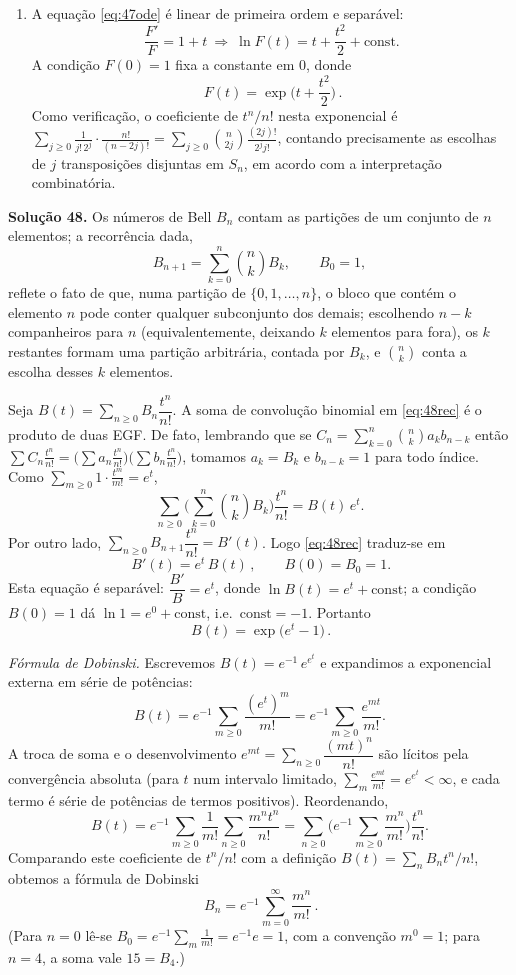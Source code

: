 \begin{enumerate}[label=(\alph*)]
\item A equação \eqref{eq:47ode} é linear de primeira ordem e separável:
\[
\frac{F'}{F}=1+t\ \Longrightarrow\ \ln F(t)=t+\frac{t^2}{2}+\text{const}.
\]
A condição $F(0)=1$ fixa a constante em $0$, donde
\[
\boxed{\,F(t)=\exp\!\Big(t+\frac{t^2}{2}\Big)\,}.
\]
Como verificação, o coeficiente de $t^n/n!$ nesta exponencial é $\sum_{j\ge0}\frac{1}{j!\,2^j}\cdot\frac{n!}{(n-2j)!}=\sum_{j\ge0}\binom{n}{2j}\frac{(2j)!}{2^j j!}$, contando precisamente as escolhas de $j$ transposições disjuntas em $S_n$, em acordo com a interpretação combinatória.

\end{enumerate}


\bigskip\noindent\textbf{Solução 48.}\quad
Os números de Bell $B_n$ contam as partições de um conjunto de $n$ elementos; a recorrência dada,
\begin{equation}\label{eq:48rec}
B_{n+1}=\sum_{k=0}^n\binom{n}{k}B_k,\qquad B_0=1,
\end{equation}
reflete o fato de que, numa partição de $\{0,1,\dots,n\}$, o bloco que contém o elemento $n$ pode conter qualquer subconjunto dos demais; escolhendo $n-k$ companheiros para $n$ (equivalentemente, deixando $k$ elementos para fora), os $k$ restantes formam uma partição arbitrária, contada por $B_k$, e $\binom{n}{k}$ conta a escolha desses $k$ elementos.

Seja $B(t)=\sum_{n\ge0}B_n\dfrac{t^n}{n!}$. A soma de convolução binomial em \eqref{eq:48rec} é o produto de duas EGF. De fato, lembrando que se $C_n=\sum_{k=0}^n\binom{n}{k}a_kb_{n-k}$ então $\sum C_n\frac{t^n}{n!}=\big(\sum a_n\frac{t^n}{n!}\big)\big(\sum b_n\frac{t^n}{n!}\big)$, tomamos $a_k=B_k$ e $b_{n-k}=1$ para todo índice. Como $\sum_{m\ge0}1\cdot\frac{t^m}{m!}=e^t$,
\[
\sum_{n\ge0}\Big(\sum_{k=0}^n\binom{n}{k}B_k\Big)\frac{t^n}{n!}=B(t)\,e^t.
\]
Por outro lado, $\sum_{n\ge0}B_{n+1}\dfrac{t^n}{n!}=B'(t)$. Logo \eqref{eq:48rec} traduz-se em
\begin{equation}\label{eq:48ode}
\boxed{\,B'(t)=e^t\,B(t)\,},\qquad B(0)=B_0=1.
\end{equation}
Esta equação é separável: $\dfrac{B'}{B}=e^t$, donde $\ln B(t)=e^t+\text{const}$; a condição $B(0)=1$ dá $\ln1=e^0+\text{const}$, i.e.\ $\text{const}=-1$. Portanto
\[
\boxed{\,B(t)=\exp\!\big(e^t-1\big)\,}.
\]

\emph{Fórmula de Dobinski.} Escrevemos $B(t)=e^{-1}\,e^{e^t}$ e expandimos a exponencial externa em série de potências:
\[
B(t)=e^{-1}\sum_{m\ge0}\frac{(e^t)^m}{m!}=e^{-1}\sum_{m\ge0}\frac{e^{mt}}{m!}.
\]
A troca de soma e o desenvolvimento $e^{mt}=\sum_{n\ge0}\dfrac{(mt)^n}{n!}$ são lícitos pela convergência absoluta (para $t$ num intervalo limitado, $\sum_m \frac{e^{mt}}{m!}=e^{e^t}<\infty$, e cada termo é série de potências de termos positivos). Reordenando,
\[
B(t)=e^{-1}\sum_{m\ge0}\frac{1}{m!}\sum_{n\ge0}\frac{m^n t^n}{n!}
=\sum_{n\ge0}\Big(e^{-1}\sum_{m\ge0}\frac{m^n}{m!}\Big)\frac{t^n}{n!}.
\]
Comparando este coeficiente de $t^n/n!$ com a definição $B(t)=\sum_n B_n t^n/n!$, obtemos a fórmula de Dobinski
\[
\boxed{\,B_n=e^{-1}\sum_{m=0}^{\infty}\frac{m^n}{m!}\,}.
\]
(Para $n=0$ lê-se $B_0=e^{-1}\sum_m \frac1{m!}=e^{-1}e=1$, com a convenção $m^0=1$; para $n=4$, a soma vale $15=B_4$.)


